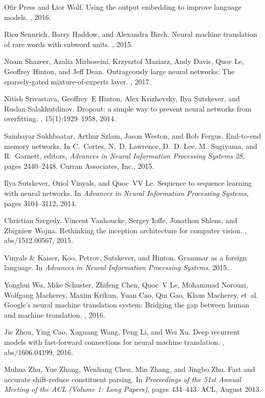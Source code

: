 \documentclass{article}
\begin{document}
\begin{thebibliography}{10}
Ofir Press and Lior Wolf.
\newblock Using the output embedding to improve language models.
, 2016.

Rico Sennrich, Barry Haddow, and Alexandra Birch.
\newblock Neural machine translation of rare words with subword units.
, 2015.

Noam Shazeer, Azalia Mirhoseini, Krzysztof Maziarz, Andy Davis, Quoc Le,
  Geoffrey Hinton, and Jeff Dean.
\newblock Outrageously large neural networks: The sparsely-gated
  mixture-of-experts layer.
, 2017.

Nitish Srivastava, Geoffrey~E Hinton, Alex Krizhevsky, Ilya Sutskever, and
  Ruslan Salakhutdinov.
\newblock Dropout: a simple way to prevent neural networks from overfitting.
, 15(1):1929--1958, 2014.

Sainbayar Sukhbaatar, Arthur Szlam, Jason Weston, and Rob Fergus.
\newblock End-to-end memory networks.
\newblock In C.~Cortes, N.~D. Lawrence, D.~D. Lee, M.~Sugiyama, and R.~Garnett,
  editors, {\em Advances in Neural Information Processing Systems 28}, pages
  2440--2448. Curran Associates, Inc., 2015.

Ilya Sutskever, Oriol Vinyals, and Quoc~VV Le.
\newblock Sequence to sequence learning with neural networks.
\newblock In {\em Advances in Neural Information Processing Systems}, pages
  3104--3112, 2014.

Christian Szegedy, Vincent Vanhoucke, Sergey Ioffe, Jonathon Shlens, and
  Zbigniew Wojna.
\newblock Rethinking the inception architecture for computer vision.
, abs/1512.00567, 2015.

{Vinyals {\&} Kaiser}, Koo, Petrov, Sutskever, and Hinton.
\newblock Grammar as a foreign language.
\newblock In {\em Advances in Neural Information Processing Systems}, 2015.

Yonghui Wu, Mike Schuster, Zhifeng Chen, Quoc~V Le, Mohammad Norouzi, Wolfgang
  Macherey, Maxim Krikun, Yuan Cao, Qin Gao, Klaus Macherey, et~al.
\newblock Google's neural machine translation system: Bridging the gap between
  human and machine translation.
, 2016.

Jie Zhou, Ying Cao, Xuguang Wang, Peng Li, and Wei Xu.
\newblock Deep recurrent models with fast-forward connections for neural
  machine translation.
, abs/1606.04199, 2016.

Muhua Zhu, Yue Zhang, Wenliang Chen, Min Zhang, and Jingbo Zhu.
\newblock Fast and accurate shift-reduce constituent parsing.
\newblock In {\em Proceedings of the 51st Annual Meeting of the ACL (Volume 1:
  Long Papers)}, pages 434--443. ACL, August 2013.

\end{thebibliography}

%

%
\end{document}

